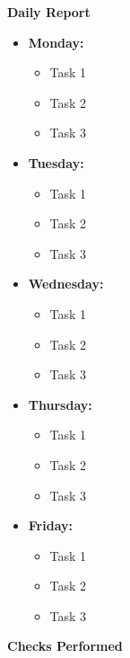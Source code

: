 \documentclass{article}
\begin{document}
\begin{center}
    \textbf{Daily Report}
\end{center}

\vspace{1em}

\begin{itemize}
    \item \textbf{Monday:}
    \begin{itemize}
        \item Task 1
        \item Task 2
        \item Task 3
    \end{itemize}
    
    \item \textbf{Tuesday:}
    \begin{itemize}
        \item Task 1
        \item Task 2
        \item Task 3
    \end{itemize}
    
    \item \textbf{Wednesday:}
    \begin{itemize}
        \item Task 1
        \item Task 2
        \item Task 3
    \end{itemize}
    
    \item \textbf{Thursday:}
    \begin{itemize}
        \item Task 1
        \item Task 2
        \item Task 3
    \end{itemize}
    
    \item \textbf{Friday:}
    \begin{itemize}
        \item Task 1
        \item Task 2
        \item Task 3
    \end{itemize}
\end{itemize}

\vspace{1em}

\begin{center}
    \textbf{Checks Performed}
\end{center}
\end{document}
